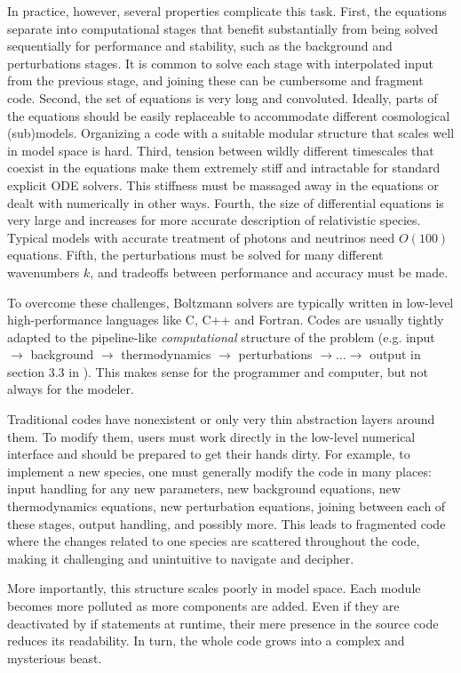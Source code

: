\documentclass{aa}
\begin{document}
In practice, however, several properties complicate this task.
First, the equations separate into computational stages that benefit substantially from being solved sequentially for performance and stability, such as the background and perturbations stages.
It is common to solve each stage with interpolated input from the previous stage, and joining these can be cumbersome and fragment code.
Second, the set of equations is very long and convoluted.
Ideally, parts of the equations should be easily replaceable to accommodate different cosmological (sub)models.
Organizing a code with a suitable modular structure that scales well in model space is hard.
Third, tension between wildly different timescales that coexist in the equations make them extremely stiff and intractable for standard explicit ODE solvers.
This stiffness must be massaged away in the equations or dealt with numerically in other ways.
Fourth, the size of differential equations is very large and increases for more accurate description of relativistic species.
Typical models with accurate treatment of photons and neutrinos need $O(100)$ equations.
Fifth, the perturbations must be solved for many different wavenumbers $k$, and tradeoffs between performance and accuracy must be made.

To overcome these challenges, Boltzmann solvers are typically written in low-level high-performance languages like C, C++ and Fortran.
Codes are usually tightly adapted to the pipeline-like \emph{computational} structure of the problem (e.g. input $\rightarrow$ background $\rightarrow$ thermodynamics $\rightarrow$ perturbations $\rightarrow \ldots \rightarrow$ output in section 3.3 in \cite{lesgourguesCosmicLinearAnisotropy2011}).
This makes sense for the programmer and computer, but not always for the modeler.

Traditional codes have nonexistent or only very thin abstraction layers around them.
To modify them, users must work directly in the low-level numerical interface and should be prepared to get their hands dirty.
For example, to implement a new species, one must generally modify the code in many places: input handling for any new parameters, new background equations, new thermodynamics equations, new perturbation equations, joining between each of these stages, output handling, and possibly more.
This leads to fragmented code where the changes related to one species are scattered throughout the code, making it challenging and unintuitive to navigate and decipher.

More importantly, this structure scales poorly in model space.
Each module becomes more polluted as more components are added.
Even if they are deactivated by if statements at runtime, their mere presence in the source code reduces its readability.
In turn, the whole code grows into a complex and mysterious beast.
\end{document}
